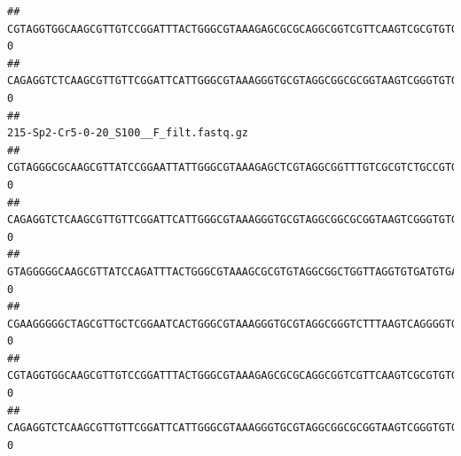 \documentclass[]{article}
\begin{document}
\begin{verbatim}
## CGTAGGTGGCAAGCGTTGTCCGGATTTACTGGGCGTAAAGAGCGCGCAGGCGGTCGTTCAAGTCGCGTGTGAAAGCCCCCGGCTCAACTGGGGAGGGTCACGCGATACTGATCGACTCGAAGGCAGGAGAGGGTAGTGGAATTCCCGGTGTAGTGGTGAAATGCGTAGATATCGGGAGGAACACCAGTGGCGAAGGCGACTACCTGGCCTGTTCTTGACGCTGAGGCGCGAAAGCTAGGGGAGCAAACG                                     0
## CAGAGGTCTCAAGCGTTGTTCGGATTCATTGGGCGTAAAGGGTGCGTAGGCGGCGCGGTAAGTCGGGTGTGAAATCTCGGGGCTTAACTCCGAAACTGCATTCGATACTGCCGTGCTTGAGGACTGGAGAGGAGACTGGAATTTACGGTGTAGCGGTGAAATGCGTAGATATCGTAAGGAAGACCAGTGGCGAAGGCGGGTCTCTGGACAGTTCCTGACGCTGAGGCACGAAGGCCAGGGGAGCAAACG                                     0
##                                                                                                                                                                                                                                                           215-Sp2-Cr5-0-20_S100__F_filt.fastq.gz
## CGTAGGGCGCAAGCGTTATCCGGAATTATTGGGCGTAAAGAGCTCGTAGGCGGTTTGTCGCGTCTGCCGTGAAAGTCCGGGGCTCAACTCCGGATCTGCGGTGGGTACGGGCAGACTAGAGTGATGTAGGGGAGACTGGAATTCCTGGTGTAGCGGTGAAATGCGCAGATATCAGGAGGAACACCGATGGCGAAGGCAGGTCTCTGGGCATTAACTGACGCTGAGGAGCGAAAGCATGGGGAGCGAACA                                      0
## CAGAGGTCTCAAGCGTTGTTCGGATTCATTGGGCGTAAAGGGTGCGTAGGCGGCGCGGTAAGTCGGGTGTGAAATCTCGGAGCTTAACTCCGAAACTGCATTCGATACTGCCGTGCTTGAGGACTGGAGAGGAGACTGGAATTTACGGTGTAGCGGTGAAATGCGTAGATATCGTAAGGAAGACCAGTGGCGAAGGCGGGTCTCTGGACAGTTCCTGACGCTGAGGCACGAAGGCCAGGGGAGCAAACG                                      0
## GTAGGGGGCAAGCGTTATCCAGATTTACTGGGCGTAAAGCGCGTGTAGGCGGCTGGTTAGGTGTGATGTGAAATCTTCCGGCTCAACCGGAAAACTGCATTGCAAACCGGCCTGGCTAGAGTGCAGGAGAGGGAAGCGGAATTCCAGGTGTAGCGGTGAAATGCGTAGATATCTGGAGGAACACCAGTGGCGAAGGCGGCTTCCTGGCCTGCAACTGACGCTGAGACGCGAAAGCGTGGGGAGCGAAC                                       0
## CGAAGGGGGCTAGCGTTGCTCGGAATCACTGGGCGTAAAGGGTGCGTAGGCGGGTCTTTAAGTCAGGGGTGAAATCCTGGAGCTCAACTCCAGAACTGCCTTTGATACTGAAGATCTTGAGTTCGGGAGAGGTGAGTGGAACTGCGAGTGTAGAGGTGAAATTCGTAGATATTCGCAAGAACACCAGTGGCGAAGGCGGCTCACTGGCCCGATACTGACGCTGAGGCACGAAAGCGTGGGGAGCAAACA                                      0
## CGTAGGTGGCAAGCGTTGTCCGGATTTACTGGGCGTAAAGAGCGCGCAGGCGGTCGTTCAAGTCGCGTGTGAAAGCCCCCGGCTCAACTGGGGAGGGTCACGCGATACTGATCGACTCGAAGGCAGGAGAGGGTAGTGGAATTCCCGGTGTAGTGGTGAAATGCGTAGATATCGGGAGGAACACCAGTGGCGAAGGCGACTACCTGGCCTGTTCTTGACGCTGAGGCGCGAAAGCTAGGGGAGCAAACG                                      0
## CAGAGGTCTCAAGCGTTGTTCGGATTCATTGGGCGTAAAGGGTGCGTAGGCGGCGCGGTAAGTCGGGTGTGAAATCTCGGGGCTTAACTCCGAAACTGCATTCGATACTGCCGTGCTTGAGGACTGGAGAGGAGACTGGAATTTACGGTGTAGCGGTGAAATGCGTAGATATCGTAAGGAAGACCAGTGGCGAAGGCGGGTCTCTGGACAGTTCCTGACGCTGAGGCACGAAGGCCAGGGGAGCAAACG                                      0

\end{verbatim}
\end{document}
